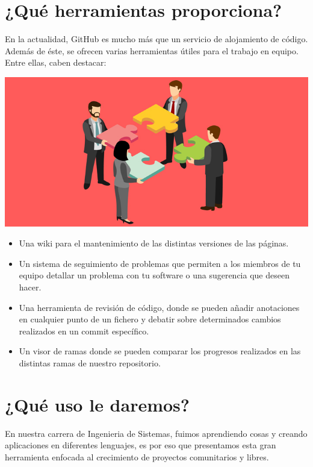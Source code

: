 \section{¿Qué herramientas proporciona?} 
En la actualidad, GitHub es mucho más que un servicio de alojamiento de código. Además de éste, se ofrecen varias herramientas útiles para el trabajo en equipo. Entre ellas, caben destacar:

\begin{center}
\includegraphics[width=14cm]{./Imagenes/imagen3} 
\end{center}

\begin{itemize}
\item Una wiki para el mantenimiento de las distintas versiones de las páginas.
\item Un sistema de seguimiento de problemas que permiten a los miembros de tu equipo detallar un problema con tu software o una sugerencia que deseen hacer.
\item Una herramienta de revisión de código, donde se pueden añadir anotaciones en cualquier punto de un fichero y debatir sobre determinados cambios realizados en un commit específico.
\item Un visor de ramas donde se pueden comparar los progresos realizados en las distintas ramas de nuestro repositorio.
\end{itemize}



\section{¿Qué uso le daremos?} 
En nuestra carrera de Ingenieria de Sistemas, fuimos aprendiendo cosas y creando aplicaciones en diferentes lenguajes, es por eso que presentamos esta gran herramienta enfocada al crecimiento de proyectos comunitarios y libres.

